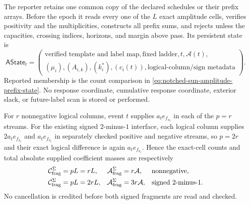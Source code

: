 \begin{theorem}
The reporter retains one common copy of the declared schedules or their
prefix arrays.  Before the epoch it reads every one of the $L$ exact
amplitude cells, verifies positivity and the multiplicities, constructs all
prefix sums, and rejects unless the capacities, crossing indices, horizons,
and margin above pass.  Its persistent state is
\begin{equation}
 \mathsf{AState}_t=\left(
 \begin{gathered}
  \text{verified template and label map},\text{fixed ladder},t,\mathcal A(t),\\
  (\mu_i),(A_{i,k}),(k_i^*),(c_i(t)),
  \text{logical-column/sign metadata}
 \end{gathered}
 \right).
 \label{eq:notched-sun-amplitude-reporter-state}
\end{equation}
Reported membership is the count comparison in
\cref{eq:notched-sun-amplitude-prefix-state}.  No response coordinate,
cumulative response coordinate, exterior slack, or future-label scan is
stored or performed.

For $r$ nonnegative logical columns, event $t$ supplies
$a_te_{f_{\pi_t}}$ in each of the $p=r$ streams.  For the existing signed
$2$-minus-$1$ interface, each logical column supplies
$2a_te_{f_{\pi_t}}$ and $a_te_{f_{\pi_t}}$ in separately checked positive
and negative streams, so $p=2r$ and their exact logical difference is again
$a_te_{f_{\pi_t}}$.  Hence the exact-cell counts and total absolute supplied
coefficient masses are respectively
\begin{align}
 \mathcal C_{\rm frag}^{\Sigma}
 &=pL=rL,
 &
 \mathcal A_{\rm frag}^{\Sigma}&=r\mathcal A,
 &&\text{nonnegative},
 \notag\\
 \mathcal C_{\rm frag}^{\Sigma}
 &=pL=2rL,
 &
 \mathcal A_{\rm frag}^{\Sigma}&=3r\mathcal A,
 &&\text{signed $2$-minus-$1$}.
 \label{eq:notched-sun-amplitude-fragments}
\end{align}
No cancellation is credited before both signed fragments are read and
checked.


\end{theorem}
